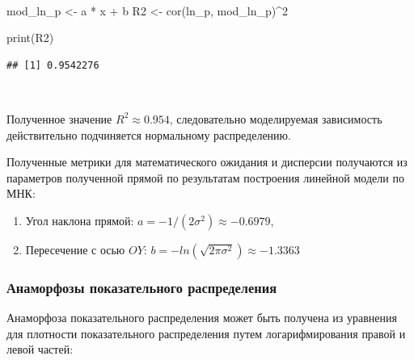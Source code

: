 \documentclass[
  14,
]{article}
\newenvironment{Shaded}{\begin{snugshade}}{\end{snugshade}}
\newcommand{\DecValTok}[1]{\textcolor[rgb]{0.00,0.00,0.81}{#1}}
\newcommand{\FunctionTok}[1]{\textcolor[rgb]{0.00,0.00,0.00}{#1}}
\newcommand{\NormalTok}[1]{#1}
\newcommand{\OtherTok}[1]{\textcolor[rgb]{0.56,0.35,0.01}{#1}}
\newcommand{\SpecialCharTok}[1]{\textcolor[rgb]{0.00,0.00,0.00}{#1}}
\begin{document}
\(\ \)

\begin{Shaded}
\begin{Highlighting}[]
\NormalTok{mod\_ln\_p }\OtherTok{\textless{}{-}}\NormalTok{ a }\SpecialCharTok{*}\NormalTok{ x }\SpecialCharTok{+}\NormalTok{ b}
\NormalTok{R2 }\OtherTok{\textless{}{-}} \FunctionTok{cor}\NormalTok{(ln\_p, mod\_ln\_p)}\SpecialCharTok{\^{}}\DecValTok{2}

\FunctionTok{print}\NormalTok{(R2)}
\end{Highlighting}
\end{Shaded}

\begin{verbatim}
## [1] 0.9542276
\end{verbatim}

\(\ \)

Полученное значение \(R^2 \approx 0.954\), следовательно моделируемая
зависимость действительно подчиняется нормальному распределению.

Полученные метрики для математического ожидания и дисперсии получаются
из параметров полученной прямой по результатам построения линейной
модели по МНК:

\begin{enumerate}
\def\labelenumi{\arabic{enumi}.}
\item
  Угол наклона прямой: \(a = -1/(2\sigma^2) \approx -0.6979\),
\item
  Пересечение с осью \(OY\):
  \(b = -ln\left(\sqrt{2 \pi \sigma^2} \right) \approx -1.3363\)
\end{enumerate}

\hypertarget{ux430ux43dux430ux43cux43eux440ux444ux43eux437ux44b-ux43fux43eux43aux430ux437ux430ux442ux435ux43bux44cux43dux43eux433ux43e-ux440ux430ux441ux43fux440ux435ux434ux435ux43bux435ux43dux438ux44f}{%
\subsubsection{\texorpdfstring{\textbf{Анаморфозы показательного
распределения}}{Анаморфозы показательного распределения}}\label{ux430ux43dux430ux43cux43eux440ux444ux43eux437ux44b-ux43fux43eux43aux430ux437ux430ux442ux435ux43bux44cux43dux43eux433ux43e-ux440ux430ux441ux43fux440ux435ux434ux435ux43bux435ux43dux438ux44f}}

Анаморфоза показательного распределения может быть получена из уравнения
для плотности показательного распределения путем логарифмирования правой
и левой частей:
\end{document}
